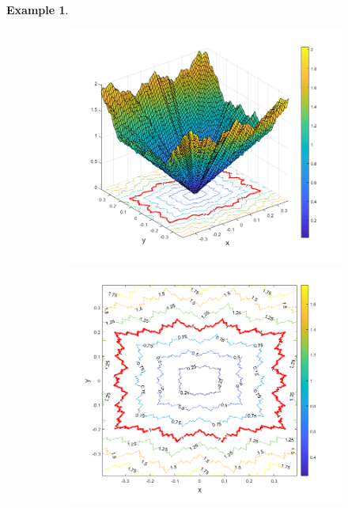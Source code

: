\documentclass[11pt]{article}
\newtheorem{example}{Example}
\theoremstyle{remark}
\begin{document}
\begin{example}
\begin{figure}[!htb]
    \centering
    \hspace{10pt}
    \begin{subfigure}{0.5\textwidth}
    \centering
    \includegraphics[scale=0.4]{WeierstrassP_and_levelsets.png}
    \vspace{-10pt}
    \includegraphics[scale=0.4]{WeierstrassP_levelsets.png}
    \end{subfigure}%

\end{figure}
\end{example}
\end{document}
